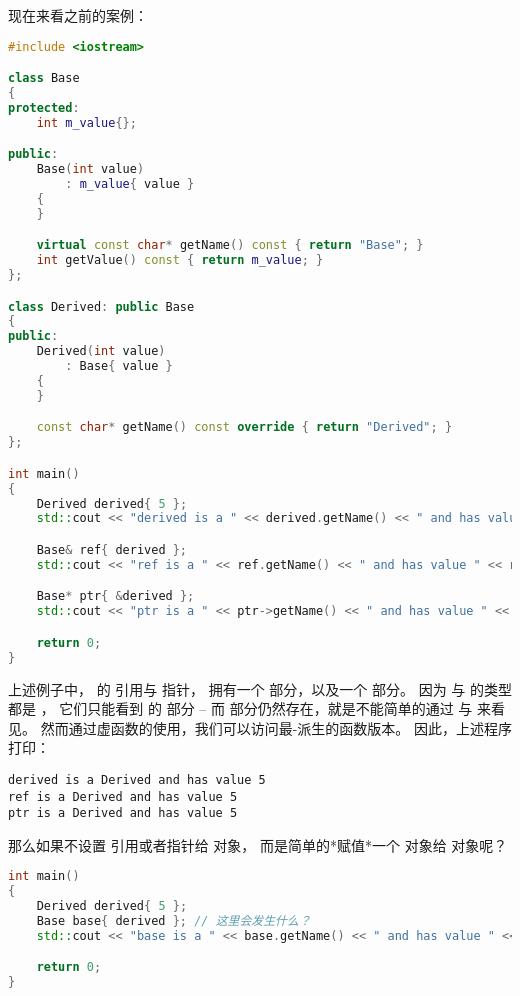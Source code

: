 \documentclass[../../LearnCpp.tex]{subfiles}
\begin{document}

现在来看之前的案例：

\begin{lstlisting}[language=C++]
#include <iostream>

class Base
{
protected:
    int m_value{};

public:
    Base(int value)
        : m_value{ value }
    {
    }

    virtual const char* getName() const { return "Base"; }
    int getValue() const { return m_value; }
};

class Derived: public Base
{
public:
    Derived(int value)
        : Base{ value }
    {
    }

    const char* getName() const override { return "Derived"; }
};

int main()
{
    Derived derived{ 5 };
    std::cout << "derived is a " << derived.getName() << " and has value " << derived.getValue() << '\n';

    Base& ref{ derived };
    std::cout << "ref is a " << ref.getName() << " and has value " << ref.getValue() << '\n';

    Base* ptr{ &derived };
    std::cout << "ptr is a " << ptr->getName() << " and has value " << ptr->getValue() << '\n';

    return 0;
}
\end{lstlisting}

上述例子中， 的  引用与  指针，
拥有一个  部分，以及一个  部分。
因为  与  的类型都是 ，
它们只能看到  的  部分 --
而  部分仍然存在，就是不能简单的通过  与  来看见。
然而通过虚函数的使用，我们可以访问最-派生的函数版本。
因此，上述程序打印：

\begin{lstlisting}
derived is a Derived and has value 5
ref is a Derived and has value 5
ptr is a Derived and has value 5
\end{lstlisting}

那么如果不设置  引用或者指针给  对象，
而是简单的*赋值*一个  对象给  对象呢？

\begin{lstlisting}[language=C++]
int main()
{
    Derived derived{ 5 };
    Base base{ derived }; // 这里会发生什么？
    std::cout << "base is a " << base.getName() << " and has value " << base.getValue() << '\n';

    return 0;
}
\end{lstlisting}
\end{document}
